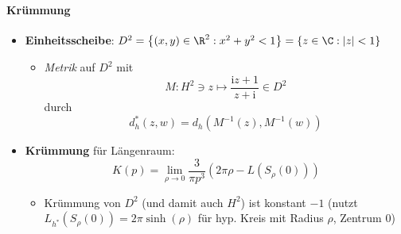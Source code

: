 \paragraph{Krümmung}
\begin{itemize}
  \item \textbf{Einheitsscheibe}: \( D^2 = \left \{ (x,y) \in \R^2 : x^2 + y^2 < 1 \right \} = \left \{ z \in \C : \left\vert z \right\vert < 1 \right \} \)
  \begin{itemize}
    \item \emph{Metrik} auf \( D^2 \) mit
    \begin{equation*}
      M: H^2 \ni z \mapsto \frac{\text{i}z + 1}{z + \text{i}} \in D^2
    \end{equation*}
    durch
    \begin{equation*}
      d_h^\ast(z,w) = d_h(M^{-1}(z),M^{-1}(w))
    \end{equation*}
  \end{itemize}
  \item \textbf{Krümmung} für Längenraum:
  \begin{equation*}
    K(p) = \lim_{\rho \to 0} \frac{3}{\pi p^3}(2\pi\rho - L(S_\rho(0)))
  \end{equation*}
  \begin{itemize}
    \item Krümmung von \( D^2 \) (und damit auch \( H^2 \)) ist konstant \( -1 \) (nutzt \( L_{h^\ast}(S_\rho(0)) = 2\pi\sinh(\rho) \) für hyp. Kreis mit Radius \( \rho \), Zentrum \( 0 \))
  \end{itemize}
\end{itemize}